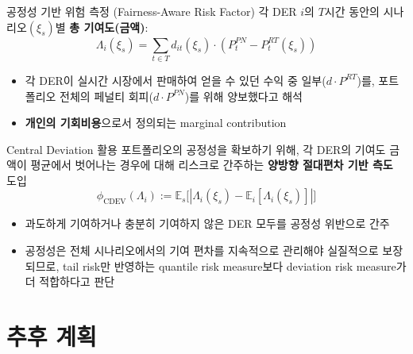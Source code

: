 \documentclass[xcolor=dvipsnames,t,9pt]{beamer}
\begin{document}
\begin{frame}{공정성 기반 위험 측정 (Fairness-Aware Risk Factor)}
    각 DER \(i\)의 $T$시간 동안의 시나리오$(\xi_s)$별 \textbf{총 기여도(금액)}:
    \[
        \Lambda_{i}(\xi_s) = \sum_{t \in T} d_{it}(\xi_s) \cdot (P^{PN}_t - P^{RT}_{t}(\xi_s))
    \]
    \vspace{-1em}
    \begin{itemize}
        \item 각 DER이 실시간 시장에서 판매하여 얻을 수 있던 수익 중 일부($d \cdot P^{RT}$)를, 포트폴리오 전체의 페널티 회피($d \cdot P^{PN}$)를 위해 양보했다고 해석
        \item \textbf{개인의 기회비용}으로서 정의되는 marginal contribution
    \end{itemize}
    \vspace{-0.5em}
    \begin{alertblock}{Central Deviation 활용}
        포트폴리오의 공정성을 확보하기 위해, 각 DER의 기여도 금액이 평균에서 벗어나는 경우에 대해 리스크로 간주하는 \textbf{양방향 절대편차 기반 측도} 도입
        \[
            \phi_{\text{CDEV}}(\Lambda_i) := \mathbb{E}_s \big[ \left| \Lambda_i(\xi_s) - \mathbb{E}_i[\Lambda_i(\xi_s)] \right| \big]
        \]
        \vspace{-1.5em}
        \begin{itemize}
            \item 과도하게 기여하거나 충분히 기여하지 않은 DER 모두를 공정성 위반으로 간주
            \item 공정성은 전체 시나리오에서의 기여 편차를 지속적으로 관리해야 실질적으로 보장되므로, tail risk만 반영하는 quantile risk measure보다 deviation risk measure가 더 적합하다고 판단
        \end{itemize}
    \end{alertblock}

\end{frame}

\section[추후 계획]{추후 계획} %
\end{document}
